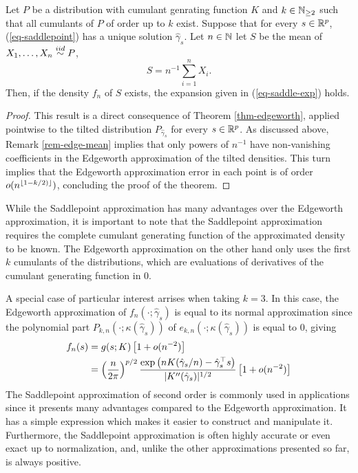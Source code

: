 \begin{theorem}
    Let $P$ be a distribution with cumulant genrating function $K$ and $k \in \mathbb{N}_{\geq 2}$ such that all cumulants of $P$ of order up to $k$ exist. Suppose that for every $s \in {\mathbb{R}^p}$, (\ref{eq-saddlepoint}) has a unique solution $\hat\gamma_s$. Let $n \in \mathbb{N}$ let $S$ be the mean of $X_1, \ldots, X_n \stackrel{iid}{\sim} P$,
    \begin{equation*}
        S = n^{-1} \sum_{i=1}^n X_i.
    \end{equation*}
    Then, if the density $f_n$ of $S$ exists, the expansion given in (\ref{eq-saddle-exp}) holds.
\end{theorem}
\begin{proof}
    This result is a direct consequence of Theorem \ref{thm-edgeworth}, applied pointwise to the tilted distribution $P_{\hat\gamma_s}$ for every $s \in {\mathbb{R}^p}$. As discussed above, Remark \ref{rem-edge-mean} implies that only powers of $n^{-1}$ have non-vanishing coefficients in the Edgeworth approximation of the tilted densities. This turn implies that the Edgeworth approximation error in each point is of order $o(n^{\lfloor1-k/2)\rfloor})$, concluding the proof of the theorem.
\end{proof}

While the Saddlepoint approximation has many advantages over the Edgeworth approximation, it is important to note that the Saddlepoint approximation requires the complete cumulant generating function of the approximated density to be known. The Edgeworth approximation on the other hand only uses the first $k$ cumulants of the distributions, which are evaluations of derivatives of the cumulant generating function in 0. 

A special case of particular interest arrises when taking $k = 3$. In this case, the Edgeworth approximation of $f_n(\cdot; \hat\gamma_s)$ is equal to its normal approximation since the polynomial part $P_{k, n}(\cdot; \kappa(\hat\gamma_s))$ of $e_{k,n}(\cdot; \kappa(\hat\gamma_s))$ is equal to 0, giving
\begin{align} \label{eq-saddle-3}
    f_n(s) &= g(s; K)\left[1 + o(n^{-2})\right]\nonumber\\
    &= \left(\frac{n}{2\pi}\right)^{p/2} \frac{\exp\left(nK(\hat\gamma_s / n) - \hat\gamma_s^\top s\right)}{|K''(\hat\gamma_s)|^{1/2}} \left[1 + o(n^{-2})\right]
\end{align}
The Saddlepoint approximation of second order is commonly used in applications since it presents many advantages compared to the Edgeworth approximation. It has a simple expression which makes it easier to construct and manipulate it. Furthermore, the Saddlepoint approximation is often highly accurate or even exact up to normalization, and, unlike the other approximations presented so far, is always positive.

